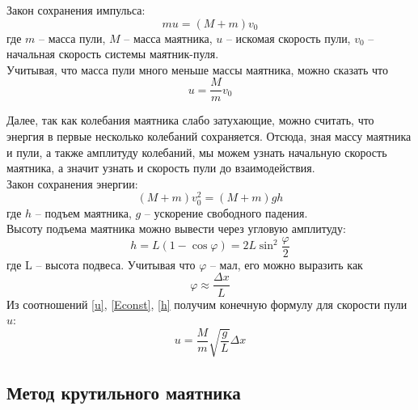 \documentclass[a4paper,12pt]{article}
\begin{document}
	Закон сохранения импульса:
	\begin{equation}
		\label{pconst}
		mu=(M+m)v_0
	\end{equation}
	где $m$ -- масса пули, $M$ -- масса маятника, $u$ -- искомая скорость пули, $v_0$ -- начальная скорость системы маятник-пуля.\\	
	
	Учитывая, что масса пули много меньше массы маятника, можно сказать что
	\begin{equation}
		\label{u}
		u=\frac{M}{m}v_0
	\end{equation}
	
	Далее, так как колебания маятника слабо затухающие, можно считать, что энергия в первые несколько колебаний сохраняется. Отсюда, зная массу маятника и пули, а также амплитуду колебаний, мы можем узнать начальную скорость маятника, а значит узнать и скорость пули до взаимодействия.\\	
	
	Закон сохранения энергии:
	\begin{equation}
		\label{Econst}
		(M+m)v_0^2=(M+m)gh
	\end{equation}
	где $h$ -- подъем маятника, $g$ -- ускорение свободного падения.\\
	
	Высоту подъема маятника можно вывести через угловую амплитуду:
	\begin{equation}
		\label{h}
		h=L(1-\cos\varphi)=2L\sin^2\frac{\varphi}{2}
	\end{equation}
	где L -- высота подвеса. Учитывая что $\varphi$ -- мал, его можно выразить как
	\begin{equation}
		\label{varphi}
		\varphi\approx\frac{\Delta x}{L}
	\end{equation}
	Из соотношений \eqref{u}, \eqref{Econst}, \eqref{h} получим конечную формулу для скорости пули $u$:
	\begin{equation}
		\label{ufinal}
		u=\frac{M}{m}\sqrt{\frac{g}{L}}\Delta x
	\end{equation}
	
	\subsection{Метод крутильного маятника}
	
\end{document}
